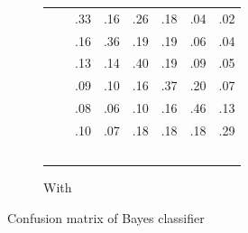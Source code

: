 \begin{figure}[tb]
\begin{center}
\begin{subfigure}[b]{0.495\textwidth}
{{\begin{tabular}{@{\hspace{0pt}}crRRRRRR}
	& & .33& .16& .26& .18& .04& .02 \\
		& & .16& .36& .19& .19& .06& .04 \\
		& & .13& .14& .40& .19& .09& .05 \\
		& & .09& .10& .16& .37& .20& .07 \\
		& & .08& .06& .10& .16& .46& .13 \\
		& & .10& .07& .18& .18& .18& .29 \\
		 \\
		\end{tabular}
}
}
\caption{With \cachebar \label{fig:confusion:enabled}}
\end{subfigure}
\end{center}
\vspace{-0.2in}
\caption{Confusion matrix of \naive{} Bayes classifier}
\label{fig:confusion}
\end{figure}


